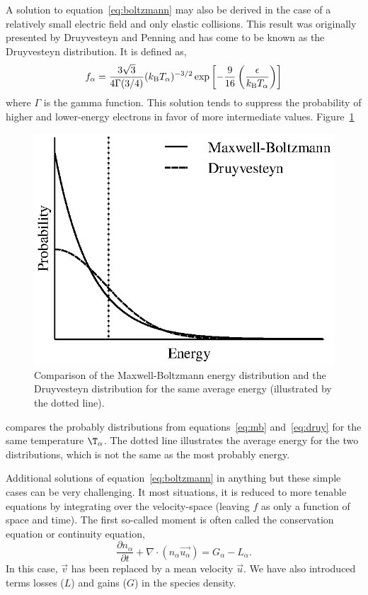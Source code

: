 A solution to equation~\ref{eq:boltzmann} may also be derived in the case of a
relatively small electric field and only elastic collisions. This result was
originally presented by Druyvesteyn and Penning \cite{Druyvesteyn1940} and has
come to be known as the Druyvesteyn distribution. It is defined as,
\begin{equation}
  f_{\alpha} = \frac{3\sqrt{3}}{4\Gamma(3/4)}(k_\mathrm{B} T_\alpha)^{-3/2}
  \exp{\left[-\frac{9}{16}\left(\frac{\epsilon}{k_\mathrm{B}T_\alpha}\right)\right]}
  \label{eq:druy}
\end{equation}
where $\Gamma$ is the gamma function. This solution tends to suppress the
probability of higher and lower-energy electrons in favor of more intermediate
values. Figure~\ref{fig:simpledists}
\begin{figure}
  \centering
  \includegraphics{./chapters/theory/figures/simpledists.eps}
  \caption{Comparison of the Maxwell-Boltzmann energy distribution and the
    Druyvesteyn distribution for the same average energy (illustrated by the
  dotted line).}
  \label{fig:simpledists}
\end{figure}
compares the probably distributions from equations~\ref{eq:mb}
and~\ref{eq:druy} for the same temperature $\T_\alpha$. The dotted line
illustrates the average energy for the two distributions, which is not the same
as the most probably energy.

Additional solutions of equation~\ref{eq:boltzmann} in anything but these simple
cases can be very challenging. It most situations, it is reduced to more tenable
equations by integrating over the velocity-space (leaving $f$ as only a function
of space and time). The first so-called moment is often called the conservation
equation or continuity equation,
\begin{equation}\label{eq:cont}
  \frac{\partial n_\alpha}{\partial t} + \nabla \cdot (n_\alpha \vec{u_\alpha})
  = G_\alpha - L_\alpha.
\end{equation}
In this case, $\vec{v}$ has been replaced by a mean velocity $\vec{u}$. We have
also introduced terms losses ($L$) and gains ($G$) in the species density.

